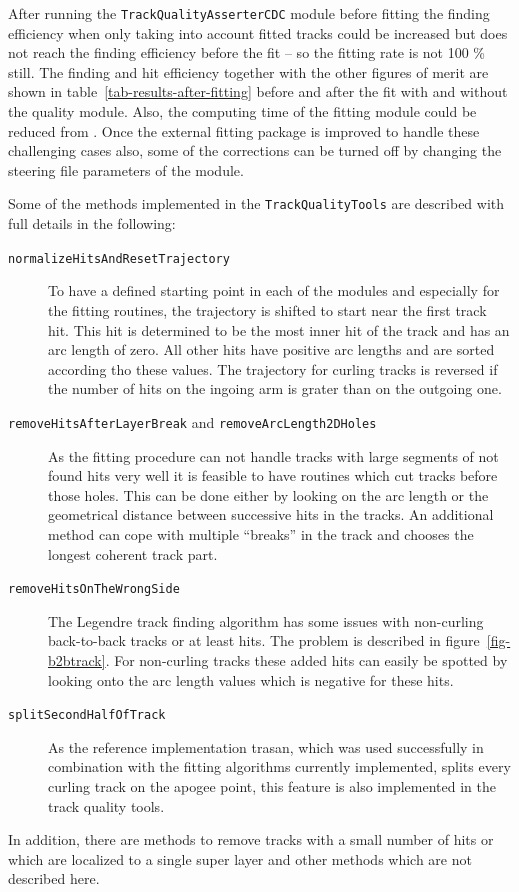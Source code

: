 After running the \texttt{Track\-Quality\-Asserter\-CDC} module before fitting the finding efficiency when only taking into account fitted tracks could be increased but does not reach the finding efficiency before the fit -- so the fitting rate is not 100 \% still. The finding and hit efficiency together with the other figures of merit are shown in table~\ref{tab-results-after-fitting} before and after the fit with and without the quality module. Also, the computing time of the fitting module could be reduced from . Once the external fitting package is improved to handle these challenging cases also, some of the corrections can be turned off by changing the steering file parameters of the module.

\begin{table}
  \caption{}
  \label{tab-results-after-fitting}
\end{table}

Some of the methods implemented in the \texttt{TrackQualityTools} are described with full details in the following:
\begin{description}
 \item[\texttt{normalizeHitsAndResetTrajectory}] To have a defined starting point in each of the modules and especially for the fitting routines, the trajectory is shifted to start near the first track hit. This hit is determined to be the most inner hit of the track and has an arc length of zero. All other hits have positive arc lengths and are sorted according tho these values. The trajectory for curling tracks is reversed if the number of hits on the ingoing arm is grater than on the outgoing one.
 \item[\texttt{removeHitsAfterLayerBreak} and \texttt{removeArcLength2DHoles}]  As the fitting procedure can not handle tracks with large segments of not found hits very well it is feasible to have routines which cut tracks before those holes. This can be done either by looking on the arc length or the geometrical distance between successive hits in the tracks. An additional method can cope with multiple ``breaks'' in the track and chooses the longest coherent track part.
 \item[\texttt{removeHitsOnTheWrongSide}] The Legendre track finding algorithm has some issues with non-curling back-to-back tracks or at least hits. The problem is described in figure~\ref{fig-b2btrack}. For non-curling tracks these added hits can easily be spotted by looking onto the arc length values which is negative for these hits.
 \item[\texttt{splitSecondHalfOfTrack}] As the reference implementation trasan, which was used successfully in combination with the fitting algorithms currently implemented, splits every curling track on the apogee point, this feature is also implemented in the track quality tools.
\end{description}
In addition, there are methods to remove tracks with a small number of hits or which are localized to a single super layer and other methods which are not described here.

